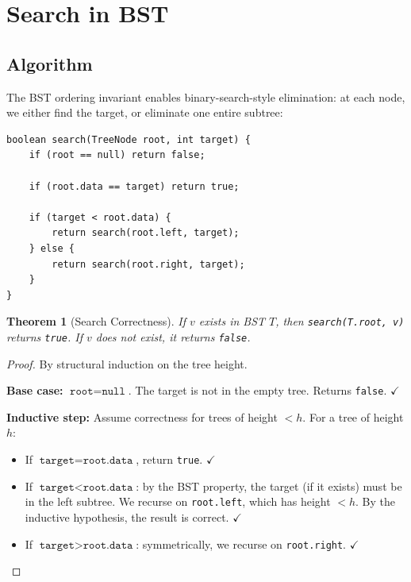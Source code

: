 \documentclass[10pt,journal,compsoc,onecolumn]{IEEEtran}
\newtheorem{theorem}{Theorem}
\begin{document}
\section{Search in BST}
\label{sec:search}

\subsection{Algorithm}

The BST ordering invariant enables binary-search-style elimination: at each node, we either find the target, or eliminate one entire subtree:

\begin{verbatim}
boolean search(TreeNode root, int target) {
    if (root == null) return false;
    
    if (root.data == target) return true;
    
    if (target < root.data) {
        return search(root.left, target);
    } else {
        return search(root.right, target);
    }
}
\end{verbatim}

\begin{theorem}[Search Correctness]
If $v$ exists in BST $T$, then \texttt{search(T.root, v)} returns \texttt{true}. If $v$ does not exist, it returns \texttt{false}.
\end{theorem}

\begin{proof}
By structural induction on the tree height.

\textbf{Base case:} $\texttt{root} = \texttt{null}$. The target is not in the empty tree. Returns \texttt{false}. $\checkmark$

\textbf{Inductive step:} Assume correctness for trees of height $< h$. For a tree of height $h$:
\begin{itemize}
    \item If $\texttt{target} = \texttt{root.data}$, return \texttt{true}. $\checkmark$
    \item If $\texttt{target} < \texttt{root.data}$: by the BST property, the target (if it exists) must be in the left subtree. We recurse on \texttt{root.left}, which has height $< h$. By the inductive hypothesis, the result is correct. $\checkmark$
    \item If $\texttt{target} > \texttt{root.data}$: symmetrically, we recurse on \texttt{root.right}. $\checkmark$
\end{itemize}
\end{proof}
\end{document}
